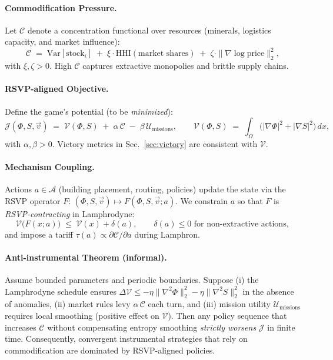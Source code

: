 \documentclass[12pt]{article}
\theoremstyle{definition}
\begin{document}
\paragraph{Commodification Pressure.}
Let $\mathcal{C}$ denote a concentration functional over resources (minerals, logistics capacity, and market influence):
\[
\mathcal{C} \;=\; \mathrm{Var}[\text{stock}_i] \;+\; \xi \cdot \mathrm{HHI}(\text{market shares}) \;+\; \zeta \cdot \|\nabla \log \text{price}\|_2^2,
\]
with $\xi,\zeta>0$. High $\mathcal{C}$ captures extractive monopolies and brittle supply chains.

\paragraph{RSVP-aligned Objective.}
Define the game’s potential (to be \emph{minimized}):
\[
\mathcal{J}(\Phi,S,\vec v) \;=\; \mathcal{V}(\Phi,S) \;+\; \alpha\,\mathcal{C} \;-\; \beta\,\mathcal{U}_{\text{missions}},
\qquad
\mathcal{V}(\Phi,S) \;=\; \int_\Omega \big(|\nabla \Phi|^2 + |\nabla S|^2\big)\,dx,
\]
with $\alpha,\beta>0$. Victory metrics in Sec.~\ref{sec:victory} are consistent with $\mathcal{V}$.

\paragraph{Mechanism Coupling.}
Actions $a\in\mathcal{A}$ (building placement, routing, policies) update the state via the RSVP operator
$F$: $(\Phi,S,\vec v)\mapsto F(\Phi,S,\vec v; a)$.
We constrain $a$ so that $F$ is \emph{RSVP-contracting} in Lamphrodyne:
\[
\mathcal{V}\big(F(x;a)\big) \;\le\; \mathcal{V}(x) + \delta(a),\qquad \delta(a)\le 0 \text{ for non-extractive actions},
\]
and impose a tariff $\tau(a)\propto \partial \mathcal{C}/\partial a$ during Lamphron.

\paragraph{Anti-instrumental Theorem (informal).}
Assume bounded parameters and periodic boundaries. Suppose (i) the Lamphrodyne schedule ensures
$\Delta\mathcal{V}\le -\eta \|\nabla^2 \Phi\|_2^2 - \eta \|\nabla^2 S\|_2^2$ in the absence of anomalies,
(ii) market rules levy $\alpha\,\mathcal{C}$ each turn, and (iii) mission utility $\mathcal{U}_{\text{missions}}$ requires local
smoothing (positive effect on $\mathcal{V}$).
Then any policy sequence that increases $\mathcal{C}$ without compensating entropy smoothing
\emph{strictly worsens} $\mathcal{J}$ in finite time. Consequently, convergent instrumental strategies
that rely on commodification are dominated by RSVP-aligned policies.
\end{document}
